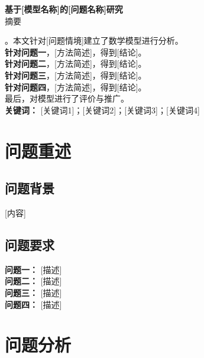 \documentclass[a4paper,12pt]{article}
\begin{document}
	
	\setcounter{page}{1}
	\begin{center}
		{\LARGE\bfseries 基于[模型名称]的[问题名称]研究} \\[0.8cm]
		{\large 摘要} \\[0.3cm]
	\end{center}
	
	\noindent [研究背景简述]。本文针对[问题情境]建立了数学模型进行分析。\\[0.3cm]
	
	\noindent \textbf{针对问题一}，[方法简述]，得到[结论]。\\[0.3cm]
	
	\noindent \textbf{针对问题二}，[方法简述]，得到[结论]。\\[0.3cm]
	
	\noindent \textbf{针对问题三}，[方法简述]，得到[结论]。\\[0.3cm]
	
	\noindent \textbf{针对问题四}，[方法简述]，得到[结论]。\\[0.3cm]
	
	\noindent 最后，对模型进行了评价与推广。\\[0.3cm]
	
	\noindent \textbf{关键词：} [关键词1]；[关键词2]；[关键词3]；[关键词4]
	
	\newpage
	
	\section{问题重述}
	
	\subsection{问题背景}
	[内容]
	
	\subsection{问题要求}
	\textbf{问题一：} [描述]\\
	\textbf{问题二：} [描述]\\
	\textbf{问题三：} [描述]\\
	\textbf{问题四：} [描述]
	
	\newpage
	
	\section{问题分析}
	
\end{document}
